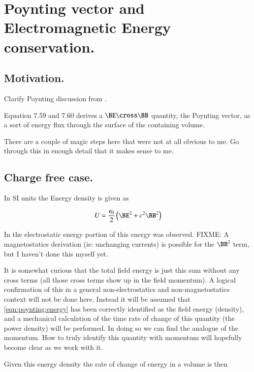 \chapter{Poynting vector and Electromagnetic Energy conservation.}\label{chap:PJpoynting}
\date{Dec 29, 2008.  poynting.tex}

\section{Motivation. }

Clarify Poynting discussion from \cite{doran2003gap}.

Equation 7.59 and 7.60 derives a $\BE \cross \BB$ quantity, the Poynting vector, as a sort of energy flux through the surface of the containing volume.

There are a couple of magic steps here that were not at all obvious to me.  Go through this in enough detail that it makes sense to me.

\section{Charge free case. }

In SI units the Energy density is given as

\begin{align}\label{eqn:poynting:energy}
U = \frac{\epsilon_0}{2}\left( \BE^2 + c^2 \BB^2 \right)
\end{align}

In  the electrostatic energy portion of this
energy was observed.
FIXME: A magnetostatics derivation (ie: unchanging currents)
is possible for the $\BB^2$ term, but I haven't done this myself yet.

It is somewhat curious that the total field energy is just this 
sum without any cross terms (all those cross terms show up in the
field momentum).  A logical confirmation of this in a general
non-electrostatics and non-magnetostatics context will not be done here.
Instead it will be assumed that \ref{eqn:poynting:energy} has been correctly identified
as the field energy (density), and a mechanical calculation of the time 
rate of change of this
quantity (the power density) will be performed.  In doing so we can find the
analogue of the momentum.  How to truly identify this quantity with momentum
will hopefully become clear as we work with it.

Given this energy density the rate of change of energy in a volume is then

